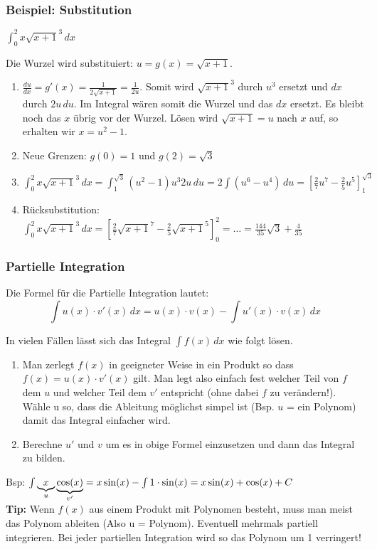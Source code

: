 \subsubsection{Beispiel: Substitution}
$\int_0^2 x \sqrt{x+1}^3 \,dx$

Die Wurzel wird substituiert: $u = g(x) = \sqrt{x+1}$.

\begin{enumerate}[itemsep=0.5em]
	\item $\frac{du}{dx} = g'(x) = \frac{1}{2\sqrt{x+1}} = \frac{1}{2u}$. Somit
	wird $\sqrt{x+1}^3$ durch $u^3$ ersetzt und $dx$ durch
	$2u\,du$. Im Integral wären somit die Wurzel und das
	$dx$ ersetzt. Es bleibt noch das $x$ übrig vor der Wurzel. Lösen wird
	$\sqrt{x+1} = u$ nach $x$ auf, so erhalten wir $x = u^2 - 1$.
	\item Neue Grenzen: $g(0) = 1$ und $g(2) = \sqrt{3}$
	\item $\int_0^2 x \sqrt{x+1}^3 \,dx = \int_1^{\sqrt{3}} (u^2 - 1)u^3 2u \,du =
	2\int(u^6 -u^4) \,du = [\frac{2}{7}u^7 - \frac{2}{5}u^5]_{1}^{\sqrt{3}}$
	\item Rücksubstitution: $\int_0^2 x \sqrt{x+1}^3 \,dx =
	[\frac{2}{7}\sqrt{x+1}^7 - \frac{2}{5}\sqrt{x+1}^5]_{0}^{2} = \ldots = \frac{144}{35}\sqrt{3} +
	\frac{4}{35}$
\end{enumerate}

\subsubsection{Partielle Integration}
Die Formel für die Partielle Integration lautet:
\[
	\int u(x) \cdot v'(x) \, dx = u(x) \cdot v(x) - \int u'(x) \cdot v(x) \, dx
\]

In vielen Fällen lässt sich das Integral $\int f(x) \, dx$ wie folgt lösen.
\begin{enumerate}
	\item Man zerlegt $f(x)$ in geeigneter Weise in ein Produkt so dass $f(x) = u(x) \cdot v'(x)$ gilt. Man legt also einfach fest welcher Teil von $f$ dem $u$ und welcher Teil dem $v'$ entspricht (ohne dabei $f$ zu verändern!). Wähle u so, dass die Ableitung möglichst simpel ist (Bsp. $u$ = ein Polynom) damit das Integral einfacher wird.

	\item Berechne $u'$ und $v$ um es in obige Formel einzusetzen und dann das Integral zu bilden.
\end{enumerate}
Bsp: $\int \underset{u}{\underbrace{x}} \, \underset{v'}{\underbrace{\cos(x)}} = x \sin(x) - \int 1 \cdot \sin(x) = x \sin(x) + \cos(x) + C$\\
\textbf{Tip:} Wenn $f(x)$ aus einem Produkt mit Polynomen besteht, muss man meist das Polynom ableiten (Also u = Polynom). Eventuell mehrmals partiell integrieren. Bei jeder partiellen Integration wird so das Polynom um 1 verringert! 

